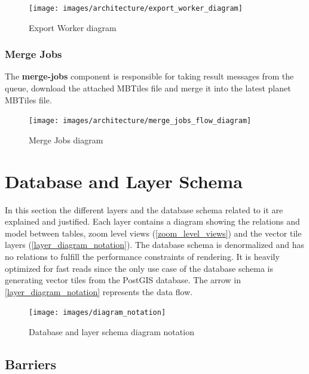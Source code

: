 \begin{figure}[H]
  \centering
  \texttt{[image: images/architecture/export\_worker\_diagram]}
  \caption{Export Worker diagram}
\end{figure}

\subsubsection{Merge Jobs}

The \textbf{merge-jobs} component is responsible for taking result messages from the queue, download the attached MBTiles file and merge it into the latest planet MBTiles file.

\begin{figure}[H]
  \centering
  \texttt{[image: images/architecture/merge\_jobs\_flow\_diagram]}
  \caption{Merge Jobs diagram}
\end{figure}

\section{Database and Layer Schema}\label{database-schema}

In this section the different layers and the database schema related to it are explained and justified. Each layer contains a diagram showing the relations and model between tables, zoom level views (\autoref{zoom_level_views}) and the vector tile layers (\autoref{layer_diagram_notation}).
The database schema is denormalized and has no relations to fulfill the performance constraints of rendering.
It is heavily optimized for fast reads since the only use case of the database schema is generating vector tiles from the PostGIS database. The arrow in \autoref{layer_diagram_notation} represents the data flow.


\begin{figure}[H]
  \centering
  \texttt{[image: images/diagram\_notation]}
  \caption{Database and layer schema diagram notation}
  \label{layer_diagram_notation}
\end{figure}

\subsection{Barriers}

